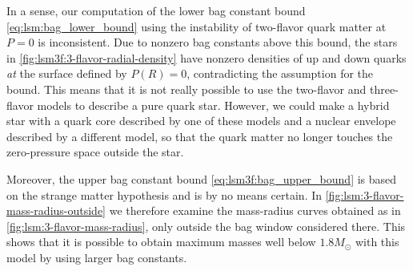 In a sense, our computation of the lower bag constant bound \eqref{eq:lsm:bag_lower_bound} using the instability of two-flavor quark matter at $P=0$ is inconsistent.
Due to nonzero bag constants above this bound, the stars in \cref{fig:lsm3f:3-flavor-radial-density} have nonzero densities of up and down quarks \emph{at} the surface defined by $P(R)=0$, contradicting the assumption for the bound.
This means that it is not really possible to use the two-flavor and three-flavor models to describe a pure quark star.
However, we could make a hybrid star with a quark core described by one of these models and a nuclear envelope described by a different model, so that the quark matter no longer touches the zero-pressure space outside the star.

Moreover, the upper bag constant bound \eqref{eq:lsm3f:bag_upper_bound} is based on the strange matter hypothesis and is by no means certain.
In \cref{fig:lsm:3-flavor-mass-radius-outside} we therefore examine the mass-radius curves obtained as in \cref{fig:lsm:3-flavor-mass-radius}, only outside the bag window considered there.
This shows that it is possible to obtain maximum masses well below $1.8 M_\odot$ with this model by using larger bag constants.







